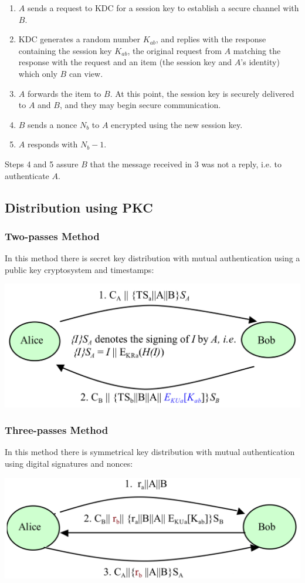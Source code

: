 \documentclass{article}
\begin{document}
\begin{enumerate}
  \item $A$ sends a request to KDC for a session key to establish a secure channel with $B$.
  \item KDC generates a random number $K_{ab}$, and replies with the response containing the session key $K_{ab}$, the original request from $A$ matching the response with the request and an item (the session key and $A$'s identity) which only $B$ can view.
  \item $A$ forwards the item to $B$. At this point, the session key is securely delivered to $A$ and $B$, and they may begin secure communication.
  \item $B$ sends a nonce $N_{b}$ to $A$ encrypted using the new session key.
  \item $A$ responds with $N_{b}-1$.
\end{enumerate}
Steps 4 and 5 assure $B$ that the message received in 3 was not a reply, i.e. to authenticate $A$.

\subsection{Distribution using PKC}
\subsubsection{Two-passes Method}
In this method there is secret key distribution with mutual authentication using a public key cryptosystem and timestamps:
\begin{center}
  \includegraphics[scale=0.4]{two-passes.png}
\end{center}
\subsubsection{Three-passes Method}
In this method there is symmetrical key distribution with mutual authentication using digital signatures and nonces:
\begin{center}
  \includegraphics[scale=0.4]{three-passes.png}
\end{center}
\end{document}
